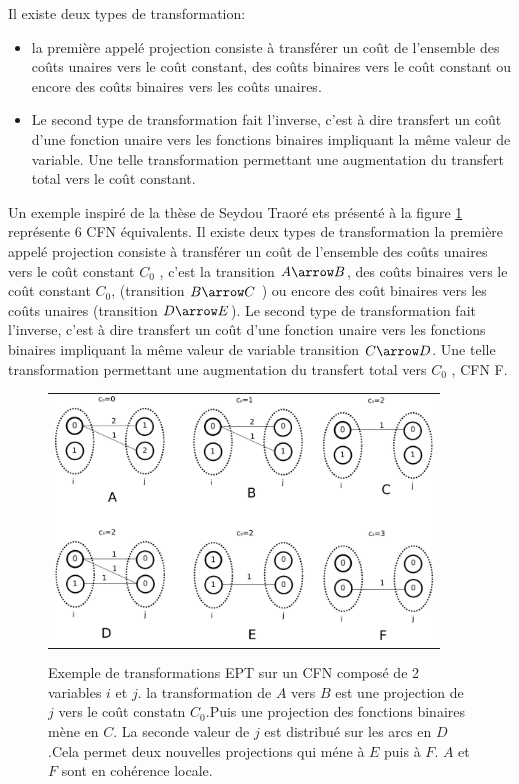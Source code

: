 Il existe deux types de transformation:
\begin{itemize}
\item la première appelé projection consiste à transférer un coût de l'ensemble des coûts unaires vers le coût constant, des coûts binaires vers le coût constant ou encore des coûts binaires vers les coûts unaires.
\item Le second type de transformation fait l'inverse, c'est à dire transfert un coût d'une fonction unaire vers les fonctions binaires impliquant la même valeur de variable. Une telle transformation permettant une augmentation du transfert total vers le coût constant.
\end{itemize}

Un exemple inspiré de la thèse de Seydou Traoré ets présenté à  la figure \ref{fig:EPT} représente 6 CFN équivalents. Il existe deux types de transformation la première appelé projection consiste à transférer un coût de l'ensemble des coûts unaires vers le coût constant $C_0$ , c'est la transition $A\arrow B$, des coûts binaires vers le coût constant $C_0$, (transition $B\arrow C$ ) ou encore des coût binaires vers les coûts unaires (transition $D\arrow E$). Le second type de transformation fait l'inverse, c'est à dire transfert un coût d'une fonction unaire vers les fonctions binaires impliquant la même valeur de variable transition $C \arrow D$. Une telle transformation permettant une augmentation du transfert total vers $C_0$ , CFN F.



\begin{figure}[!htbp]
  \centering
  \begin{tabular}{c}
    \includegraphics[width=10cm]{figure/coherences_local.png} \\
  \end{tabular}
  \caption{Exemple de transformations EPT sur un CFN composé de 2 variables $i$ et $j$. la transformation de $A$ vers $B$ est une projection de $j$ vers le coût constatn $C_0$.Puis une projection des fonctions binaires mène en $C$. La seconde valeur de $j$ est distribué sur les arcs en $D$.Cela permet deux nouvelles projections qui méne à $E$ puis à $F$. $A$ et $F$ sont en cohérence locale.}
  \label{fig:EPT}
\end{figure}




